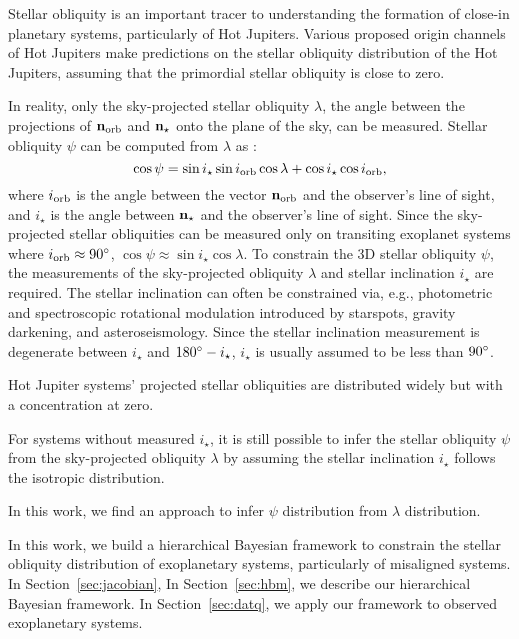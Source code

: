 \documentclass[twocolumn,times]{aastex631}
\begin{document}
Stellar obliquity is an important tracer to understanding the formation of close-in planetary systems, particularly of Hot Jupiters. Various proposed origin channels of Hot Jupiters make predictions on the stellar obliquity distribution of the Hot Jupiters, assuming that the primordial stellar obliquity is close to zero.

In reality, only the sky-projected stellar obliquity $\lambda$, the angle between the projections of $\bf{n}_{\rm orb}$ and $\bf{n}_{\star}$ onto the plane of the sky, can be measured. Stellar obliquity $\psi$ can be computed from $\lambda$ as \citep[e.g.,][]{Fabrycky09}:
\begin{equation}\label{eqn:psi}
    \cos{\psi} = \sin{i_\star}\sin{i_{\rm orb}}\cos{\lambda} + \cos{i_\star}\cos{i_{\rm orb}},
\end{equation}
where $i_{\rm orb}$ is the angle between the vector $\bf{n}_{\rm orb}$ and the observer's line of sight, and $i_\star$ is the angle between $\bf{n}_{\star}$ and the observer's line of sight.
Since the sky-projected stellar obliquities can be measured only on transiting exoplanet systems where $i_{\rm orb} \approx 90\mbox{$^\circ$}$, $\cos{\psi} \approx \sin{i_\star}\cos{\lambda}$.
To constrain the 3D stellar obliquity $\psi$, the measurements of the sky-projected obliquity $\lambda$ and stellar inclination $i_\star$ are required. The stellar inclination can often be constrained via, e.g., photometric and spectroscopic rotational modulation introduced by starspots, gravity darkening, and asteroseismology. Since the stellar inclination measurement is degenerate between $i_\star$ and $180\mbox{$^\circ$} - i_\star$, $i_\star$ is usually assumed to be less than $90\mbox{$^\circ$}$.

Hot Jupiter systems' projected stellar obliquities are distributed widely but with a concentration at zero.

For systems without measured $i_\star$, it is still possible to infer the stellar obliquity $\psi$ from the sky-projected obliquity $\lambda$ by assuming the stellar inclination $i_\star$ follows the isotropic distribution.

In this work, we find an approach to infer $\psi$ distribution from $\lambda$ distribution.

In this work, we build a hierarchical Bayesian framework to constrain the stellar obliquity distribution of exoplanetary systems, particularly of misaligned systems.
In Section~\ref{sec:jacobian},
In Section~\ref{sec:hbm}, we describe our hierarchical Bayesian framework. 
In Section~\ref{sec:datq}, we apply our framework to observed exoplanetary systems.
\end{document}
